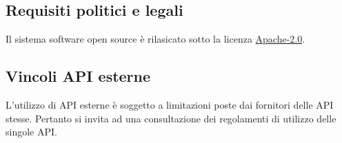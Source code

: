 \documentclass[a4paper,11pt,titlepage]{article}       %
\begin{document}
    \subsection{Requisiti politici e legali}
        Il sistema software open source è rilasicato sotto la licenza \href{https://github.com/AndreaGrandieri/MagicMirror-GBM/blob/main/LICENSE}{Apache-2.0}.
    
    \subsection{Vincoli API esterne}
        L'utilizzo di API esterne è soggetto a limitazioni poste dai fornitori delle API stesse. Pertanto si invita ad una consultazione dei regolamenti di utilizzo delle singole API.
\clearpage
    \printglossary[nonumberlist]
\end{document}
